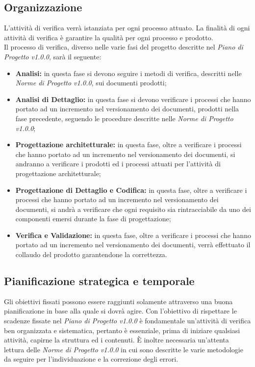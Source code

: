 \subsection{Organizzazione}
L'attività di verifica verrà istanziata per ogni processo attuato. La finalità di ogni attività di verifica è garantire la qualità per ogni processo e prodotto.\\
Il processo di verifica, diverso nelle varie fasi del progetto descritte nel \textit{Piano di Progetto v1.0.0}, sarà il seguente:
\begin{itemize}
	\item \textbf{Analisi:} in questa fase si devono seguire i metodi di verifica, descritti nelle \textit{Norme di Progetto v1.0.0}, sui documenti prodotti;
	\item \textbf{Analisi di Dettaglio:} in questa fase si devono verificare i processi che hanno portato ad un incremento nel versionamento dei documenti, prodotti nella fase precedente, seguendo le procedure descritte nelle \textit{Norme di Progetto v1.0.0};
	\item \textbf{Progettazione architetturale:} in questa fase, oltre a verificare i processi che hanno portato ad un incremento nel versionamento dei documenti, si andranno a verificare i prodotti ed i processi attuati per l'attività di progettazione architetturale;
	\item \textbf{Progettazione di Dettaglio e Codifica:} in questa fase, oltre a verificare i processi che hanno portato ad un incremento nel versionamento dei documenti, si andrà a verificare che ogni requisito sia rintracciabile da uno dei componenti emersi durante la fase di progettazione;
	\item \textbf{Verifica e Validazione:} in questa fase, oltre a verificare i processi che hanno portato ad un incremento nel versionamento dei documenti, verrà effettuato il collaudo del prodotto garantendone la correttezza.
\end{itemize} 

\subsection{Pianificazione strategica e temporale}
Gli obiettivi fissati possono essere raggiunti solamente attraverso una buona pianificazione in base alla quale si dovrà agire. Con l'obiettivo di rispettare le scadenze fissate nel \textit{Piano di Progetto v1.0.0} è fondamentale un'attività di verifica ben organizzata e sistematica, pertanto è essenziale, prima di iniziare qualsiasi attività, capirne la struttura ed i contenuti. È inoltre necessaria un'attenta lettura delle \textit{Norme di Progetto v1.0.0} in cui sono descritte le varie metodologie da seguire per l'individuazione e la correzione degli errori.

